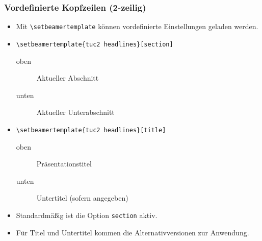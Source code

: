 \begin{frame}[containsverbatim]
\frametitle{Vordefinierte Kopfzeilen (2-zeilig)}

\begin{itemize}
\item Mit \lstinline[language={[LaTeX]{TeX}}]+\setbeamertemplate+ können
      vordefinierte Einstellungen geladen werden.

\bigskip

\item \lstinline[language={[LaTeX]{TeX}}]+\setbeamertemplate{tuc2 headlines}[section]+
  \begin{description}
  \item[oben]  Aktueller Abschnitt
  \item[unten] Aktueller Unterabschnitt
  \end{description}

\item \lstinline[language={[LaTeX]{TeX}}]+\setbeamertemplate{tuc2 headlines}[title]+
  \begin{description}
  \item[oben]  Präsentationstitel
  \item[unten] Untertitel (sofern angegeben)
  \end{description}

\bigskip

\item Standardmäßig ist die Option \texttt{section} aktiv.
\item Für Titel und Untertitel kommen die Alternativversionen zur Anwendung.
\end{itemize}
\end{frame}



